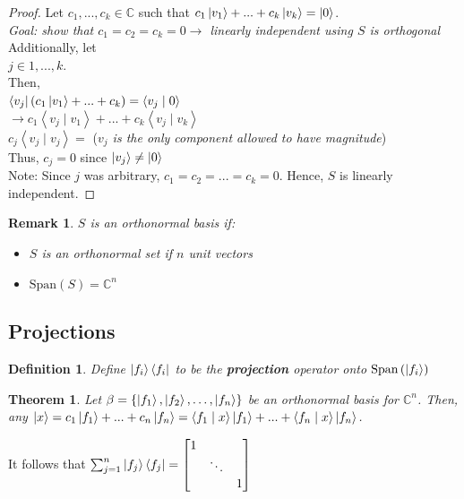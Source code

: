 \documentclass[12pt]{article}
\theoremstyle{plain}
\newtheorem{theorem}[lemma]{Theorem}
\theoremstyle{nonumberplain}
\theoremstyle{plain}
\newtheorem{definition}[lemma]{Definition}
\newtheorem{remark}[lemma]{Remark}
\theoremstyle{nonumberplain}
\newtheorem{proof}{Proof.}
\newcommand\1{{\bf 1}}
\newcommand{\bmat}[1]{\begin{bmatrix*} #1 \end{bmatrix*}} %
\newcommand{\C}{\mathbb{C}} %
\newcommand{\<}{\left\langle}
\renewcommand{\>}{\right\rangle}
\newcommand{\lp}{\left(}
\newcommand{\rp}{\right)}
\newcommand{\lb}{\left\{}
\newcommand{\rb}{\right\}}
\newcommand{\inp}[2]{\left\langle#1\mid #2\right\rangle} %
\newcommand{\spn}[1]{\text{Span}\lp #1\rp} %
\newcommand{\setofkets}[1]{\lb \ket{#1_1}, \ket{#1_2}, \ldots, \ket{#1_n}\rb} %
\begin{document}
\begin{proof}
Let $c_1, ..., c_k\in\C$ such that $c_1\ket{v_1}+...+c_k\ket{v_k}=\ket{0}$. \\
\textit{Goal: show that $c_1=c_2=c_k=0\longrightarrow$ linearly independent using $S$ is orthogonal} \\
Additionally, let \\ 
\indent $j\in{1,...,k}$.\\
Then, \\ 
\indent $\bra{v_j}(c_1\ket{v_1}+...+c_k)=\inp{v_j}{0}$ \\
\indent $\longrightarrow c_1\inp{v_j}{v_1}+...+c_k\inp{v_j}{v_k}$ \\
\indent $c_j\inp{v_j}{v_j}=$ (\textit{$v_j$ is the only component allowed to have magnitude}) \\
Thus, $c_j=0$ since $\ket{v_j}\neq\ket{0}$ \\
Note: Since $j$ was arbitrary, $c_1 = c_2 = ... = c_k = 0$. Hence, $S$ is linearly independent.
\end{proof}

\begin{remark}
$S$ is an orthonormal basis if:
\begin{itemize}
	\item $S$ is an orthonormal set if $n$ unit vectors
	\item $\spn{S}=\C^n$
\end{itemize}
\end{remark}


\subsection{Projections}

\begin{definition}
Define $\ket{f_i}\bra{f_i}$ to be the \textbf{projection} operator onto $\spn{\ket{f_i}}$
\end{definition}

\begin{theorem}
Let $\beta=\setofkets{f}$ be an orthonormal basis for $\C^n$. Then, any $\ket{x}=c_1\ket{f_1}+...+c_n\ket{f_n}=\inp{f_1}{x}\ket{f_1}+...+\inp{f_n}{x}\ket{f_n}$.
\end{theorem}
It follows that $\sum_{j=1}^{n} \ket{f_j}\bra{f_j}=\bmat{1 &  &  \\  & \ddots &  \\  &  &  1}$
\end{document}
